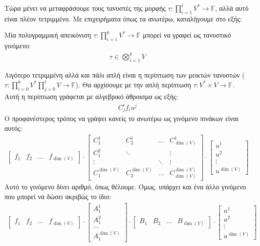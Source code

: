 \documentclass[main.tex]{subfiles}
\begin{document}
 	Τώρα μένει να μεταφράσουμε τους τανυστές της μορφής $\tau:\prod_{i=1}^{\ell}V^*\rightarrow\mathbb{F}$, αλλά αυτό είναι πλέον τετριμμένο. Με επιχειρήματα όπως τα ανωτέρω, καταλήγουμε στο εξής:
 	\begin{corollary}
 		Μία πολυγραμμική απεικόνιση ${\tau:\prod_{i=1}^{k}V^*\rightarrow\mathbb{F}}$ μπορεί να γραφεί ως τανυστικό γινόμενο:
 		\begin{align*}
 			\tau \in \bigotimes_{i=1}^{k}V
 		\end{align*}
 	\end{corollary}
 
 	Λιγότερο τετριμμένη αλλά και πάλι απλή είναι η περίπτωση των μεικτών τανυστών ($\tau:\prod_{i=0}^{k}V^*\prod_{j=0}^{\ell}V\rightarrow\mathbb{F}$). Θα αρχίσουμε με την απλή περίπτωση $\tau:V^*\times V\rightarrow\mathbb{F}$.
 	Αυτή η περίπτωση γράφεται με αλγεβρικό άθροισμα ως εξής:
 	\begin{align*}
 		C^{i}_{j}f_iu^j
 	\end{align*}
 	Ο προφανέστερος τρόπος να γράψει κανείς το ανωτέρω ως γινόμενο πινάκων είναι αυτός:
 	\begin{align*}
 		\begin{bmatrix}
 			f_1 & f_2 & \ldots & f_{\dim(V)} 
 		\end{bmatrix} \cdot
 		\begin{bmatrix}
 			C^1_1 & C^1_2 & \ldots & C^1_{\dim(V)} \\
 			C^2_1 & \ddots & & \vdots\\
 			\vdots & & \ddots & \vdots \\
 			C^{\dim(V)}_1 & C^{\dim(V)}_2 & \ldots & C^{\dim(V)}_{\dim(V)}
 		\end{bmatrix} \cdot
 		\begin{bmatrix}
 			u^1 \\
 			u^2 \\
 			\vdots\\
 			u^{\dim(V)}
 		\end{bmatrix}
 	\end{align*}
 	Αυτό το γινόμενο δίνει αριθμό, όπως θέλουμε. Όμως, υπάρχει και ένα άλλο γινόμενο που μπορεί να δώσει ακριβώς το ίδιο:
 	\begin{align*}
 		\begin{bmatrix}
 			f_1 & f_2 & \ldots & f_{\dim(V)} 
 		\end{bmatrix} \cdot
 		\begin{bmatrix}
 			A^1_1 \\
 			A^2_1 \\
 			\ldots \\
 			A^{\dim(V)}_1 
 		\end{bmatrix} \cdot
 		\begin{bmatrix}
 			B_1 & B_2 & \ldots & B_{\dim(V)} 
 		\end{bmatrix} \cdot
 		\begin{bmatrix}
 			u^1 \\
 			u^2 \\
 			\vdots\\
 			u^{\dim(V)}
 		\end{bmatrix}
 	\end{align*}
\end{document}
